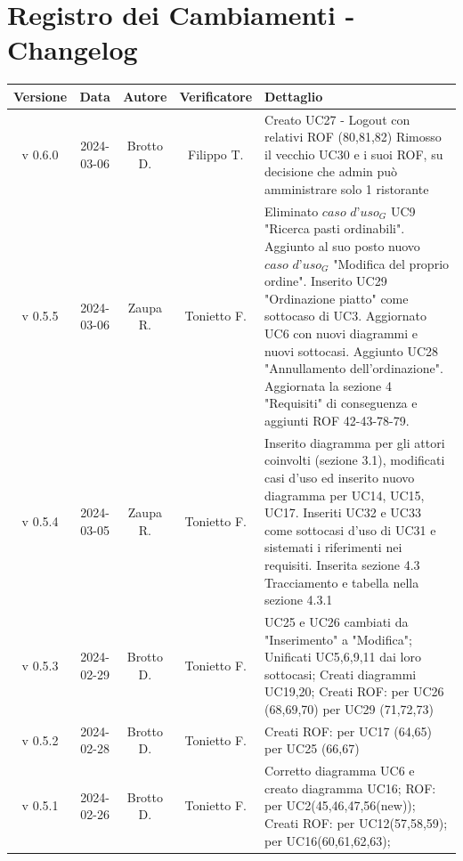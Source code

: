 \documentclass[12pt, oneside]{article}
\begin{document}
\section*{Registro dei Cambiamenti - Changelog}
\begin{longtable}{|c|c|c|c|p{7cm}|}
\hline
\textbf{Versione} & \textbf{Data} & \textbf{Autore} & \textbf{Verificatore} & 
\textbf{Dettaglio} \\
\hline
v 0.6.0 & 2024-03-06 & Brotto D. & Filippo T. & Creato UC27 - Logout con relativi ROF (80,81,82) 
\newline Rimosso il vecchio UC30 e i suoi ROF, su decisione che admin può amministrare solo 1 ristorante
\\
\hline
v 0.5.5 & 2024-03-06 & Zaupa R. & Tonietto F. & Eliminato $\textit{caso d'uso}_G$ UC9 "Ricerca pasti ordinabili". Aggiunto al suo posto nuovo $\textit{caso d'uso}_G$ "Modifica del proprio ordine". Inserito UC29 "Ordinazione piatto" come sottocaso di UC3. Aggiornato UC6 con nuovi diagrammi e nuovi sottocasi. Aggiunto UC28 "Annullamento dell'ordinazione". Aggiornata la sezione 4 "Requisiti" di conseguenza e aggiunti ROF 42-43-78-79. \\
\hline
v 0.5.4 & 2024-03-05 & Zaupa R. & Tonietto F. & Inserito diagramma per gli attori coinvolti (sezione 3.1), modificati casi d'uso ed inserito nuovo diagramma per UC14, UC15, UC17. Inseriti UC32 e UC33 come sottocasi d'uso di UC31 e sistemati i riferimenti nei requisiti. Inserita sezione 4.3 Tracciamento e tabella nella sezione 4.3.1\\
\hline
v 0.5.3 & 2024-02-29 & Brotto D. & Tonietto F. & UC25 e UC26 cambiati da "Inserimento" a "Modifica";
\newline Unificati UC5,6,9,11 dai loro sottocasi;
\newline Creati diagrammi UC19,20;
\newline Creati ROF:
\newline per UC26 (68,69,70)
\newline per UC29 (71,72,73)
\\
\hline
v 0.5.2 & 2024-02-28 & Brotto D. & Tonietto F. & Creati ROF:
\newline per UC17 (64,65) 
\newline per UC25 (66,67)
\\
\hline
v 0.5.1 & 2024-02-26 & Brotto D. & Tonietto F. & Corretto diagramma UC6 e creato diagramma UC16; \newline ROF: per UC2(45,46,47,56(new)); 
\newline Creati ROF: \newline per UC12(57,58,59); \newline per UC16(60,61,62,63); \\

\end{longtable}
\end{document}
